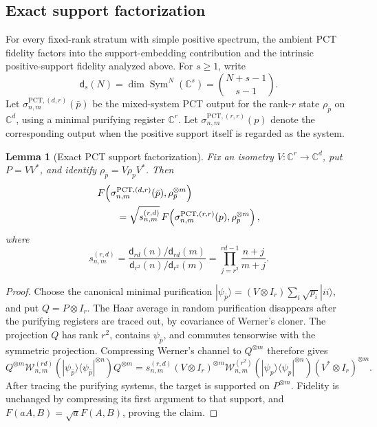 \documentclass[11pt]{article}
\newtheorem{lemma}[lemma]{Lemma}
\theoremstyle{remark}
\theoremstyle{plain}
\newcommand{\C}{\mathbb C}
\newcommand{\ket}[1]{|#1\rangle}
\newcommand{\proj}[1]{|#1\rangle\!\langle #1|}
\newcommand{\ot}{\otimes}
\begin{document}
\subsection{Exact support factorization}

For every fixed-rank stratum with simple positive spectrum, the ambient PCT fidelity factors into
the support-embedding contribution and the intrinsic positive-support
fidelity analyzed above.  For \(s\ge1\), write
\[
  \mathsf d_s(N)=\dim\operatorname{Sym}^N(\C^s)
  =\binom{N+s-1}{s-1}.
\]
Let \(\sigma_{n,m}^{\mathrm{PCT},(d,r)}(\bar p)\) be the mixed-system PCT
output for the rank-\(r\) state \(\rho_{\bar p}\) on \(\C^d\), using a
minimal purifying register \(\C^r\).  Let
\(\sigma_{n,m}^{\mathrm{PCT},(r,r)}(p)\) denote the corresponding output
when the positive support itself is regarded as the system.

\begin{lemma}[Exact PCT support factorization]
\label{lem:pct-support-factorization}
Fix an isometry \(V:\C^r\to\C^d\), put \(P=VV^*\), and identify
\(\rho_{\bar p}=V\rho_pV^*\).  Then
\begin{align}
 &F\!\left(
   \sigma_{n,m}^{\mathrm{PCT},(d,r)}(\bar p),
   \rho_{\bar p}^{\ot m}
 \right)\notag\\
 &\qquad=\sqrt{s_{n,m}^{(r,d)}}\,
 F\!\left(
   \sigma_{n,m}^{\mathrm{PCT},(r,r)}(p),
   \rho_p^{\ot m}
 \right),
 \label{eq:pct-support-factorization}
\end{align}
where
\begin{equation}
  s_{n,m}^{(r,d)}
  =\frac{\mathsf d_{rd}(n)/\mathsf d_{rd}(m)}
         {\mathsf d_{r^2}(n)/\mathsf d_{r^2}(m)}
  =\prod_{j=r^2}^{rd-1}\frac{n+j}{m+j}.
  \label{eq:pct-support-factor}
\end{equation}
\end{lemma}

\begin{proof}
Choose the canonical minimal purification
\(\ket{\psi_{\bar p}}=(V\ot I_r)\sum_i\sqrt{p_i}\ket{ii}\), and put
\(Q=P\ot I_r\).  The Haar average in random purification disappears after
the purifying registers are traced out, by covariance of Werner's cloner.
The projection \(Q\) has rank \(r^2\), contains
\(\psi_{\bar p}\), and commutes tensorwise with the symmetric projection.
Compressing Werner's channel to \(Q^{\ot m}\) therefore gives
\[
 Q^{\ot m}\mathcal W_{n,m}^{(rd)}
   (\proj{\psi_{\bar p}}^{\ot n})Q^{\ot m}
 =s_{n,m}^{(r,d)}(V\ot I_r)^{\ot m}
  \mathcal W_{n,m}^{(r^2)}(\proj{\psi_p}^{\ot n})
  (V^*\ot I_r)^{\ot m}.
\]
After tracing the purifying systems, the target is supported on
\(P^{\ot m}\).  Fidelity is unchanged by compressing its first argument
to that support, and \(F(aA,B)=\sqrt aF(A,B)\), proving the claim.
\end{proof}
\end{document}
